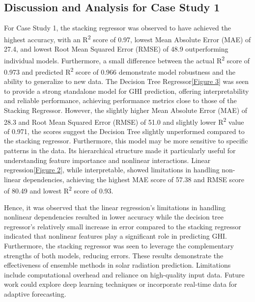 \documentclass[10pt,twocolumn]{article}
\begin{document}
\begin{itemize}
\subsection{Discussion and Analysis for Case Study 1}
For Case Study 1, the stacking regressor was observed to have achieved the highest accuracy, with an R\textsuperscript{2} score of 0.97, lowest Mean Absolute Error (MAE) of 27.4, and lowest Root Mean Squared Error (RMSE) of 48.9 outperforming individual models. Furthermore, a small difference between the actual R\textsuperscript{2} score of 0.973 and predicted R\textsuperscript{2} score of 0.966 demonstrate model robustness and the ability to generalize to new data.
The Decision Tree Regressor\ref{Figure 3} was seen to provide a strong standalone model for GHI prediction, offering interpretability and reliable performance, achieving performance metrics close to those of the Stacking Regressor. However, the slightly higher Mean Absolute Error (MAE) of 28.3 and Root Mean Squared Error (RMSE) of 51.0 and slightly lower  R\textsuperscript{2} value of 0.971, the scores suggest the Decision Tree slightly unperformed compared to the stacking regressor. Furthermore, this model may be more sensitive to specific patterns in the data. Its hierarchical structure made it particularly useful for understanding feature importance and nonlinear interactions. 
Linear regression\ref{Figure 2}, while interpretable, showed limitations in handling non-linear dependencies, achieving the highest MAE score of 57.38 and RMSE score of 80.49 and lowest R\textsuperscript{2} score of 0.93. 

Hence, it was observed that the linear regression's  limitations in handling nonlinear dependencies resulted in lower accuracy while the decision tree regressor's relatively small increase in error compared to the stacking regressor indicated that nonlinear features play a significant role in predicting GHI. Furthermore,
the stacking regressor was seen to leverage the complementary strengths of both models, reducing errors. These results demonstrate the effectiveness of ensemble methods in solar radiation prediction. Limitations include computational overhead and reliance on high-quality input data. Future work could explore deep learning techniques or incorporate real-time data for adaptive forecasting.

\end{itemize}
\end{document}
